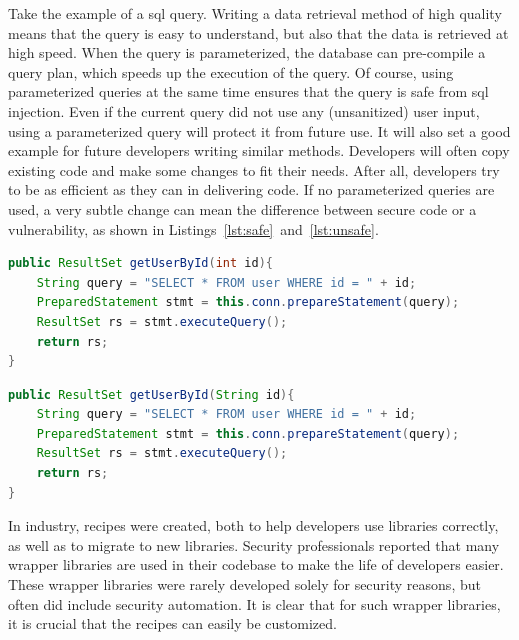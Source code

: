 Take the example of a \gls{sql} query.
Writing a data retrieval method of high quality means that the query is easy to understand, but also that the data is retrieved at high speed.
When the query is parameterized, the database can pre-compile a query plan, which speeds up the execution of the query.
Of course, using parameterized queries at the same time ensures that the query is safe from \gls{sql} injection.
Even if the current query did not use any (unsanitized) user input, using a parameterized query will protect it from future use.
It will also set a good example for future developers writing similar methods.
Developers will often copy existing code and make some changes to fit their needs.
After all, developers try to be as efficient as they can in delivering code.
If no parameterized queries are used, a very subtle change can mean the difference between secure code or a vulnerability, as shown in Listings~\ref{lst:safe}~and~\ref{lst:unsafe}.

\begin{lstlisting}[float,language={Java},caption={This method concatenates an integer value to the query. An integer variable can not alter the query, and hence this method can not lead to SQL injection.},
float,label={lst:safe},abovecaptionskip=-0.0pt]
public ResultSet getUserById(int id){
    String query = "SELECT * FROM user WHERE id = " + id;
    PreparedStatement stmt = this.conn.prepareStatement(query);
    ResultSet rs = stmt.executeQuery();
    return rs;
}
\end{lstlisting}

\begin{lstlisting}[language={Java},caption={This method concatenates a String variable to the query. As a result it is vulnerable to SQL injection.}, float,label={lst:unsafe},abovecaptionskip=-0.0pt]
public ResultSet getUserById(String id){
    String query = "SELECT * FROM user WHERE id = " + id;
    PreparedStatement stmt = this.conn.prepareStatement(query);
    ResultSet rs = stmt.executeQuery();
    return rs;
}
\end{lstlisting}

In industry, recipes were created, both to help developers use libraries correctly, as well as to migrate to new libraries.
Security professionals reported that many wrapper libraries are used in their codebase to make the life of developers easier.
These wrapper libraries were rarely developed solely for security reasons, but often did include security automation.
It is clear that for such wrapper libraries, it is crucial that the recipes can easily be customized.

